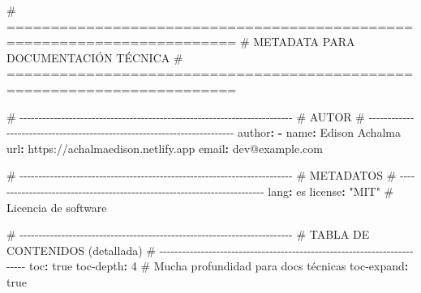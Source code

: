 \documentclass[
  doc,
  floatsintext,
  longtable,
  a4paper,
  nolmodern,
  notxfonts,
  notimes,
  12pt,
  colorlinks=true,linkcolor=blue,citecolor=blue,urlcolor=blue]{apa7}
\newenvironment{Shaded}{\begin{snugshade}}{\end{snugshade}}
\newcommand{\AttributeTok}[1]{\textcolor[rgb]{0.40,0.45,0.13}{#1}}
\newcommand{\CharTok}[1]{\textcolor[rgb]{0.13,0.47,0.30}{#1}}
\newcommand{\CommentTok}[1]{\textcolor[rgb]{0.37,0.37,0.37}{#1}}
\newcommand{\DecValTok}[1]{\textcolor[rgb]{0.68,0.00,0.00}{#1}}
\newcommand{\FunctionTok}[1]{\textcolor[rgb]{0.28,0.35,0.67}{#1}}
\newcommand{\KeywordTok}[1]{\textcolor[rgb]{0.00,0.23,0.31}{\textbf{#1}}}
\newcommand{\StringTok}[1]{\textcolor[rgb]{0.13,0.47,0.30}{#1}}
\begin{document}
\begin{Shaded}
\begin{Highlighting}[]
\CommentTok{\# ========================================================================}
\CommentTok{\# METADATA PARA DOCUMENTACIÓN TÉCNICA}
\CommentTok{\# ========================================================================}

\CommentTok{\# {-}{-}{-}{-}{-}{-}{-}{-}{-}{-}{-}{-}{-}{-}{-}{-}{-}{-}{-}{-}{-}{-}{-}{-}{-}{-}{-}{-}{-}{-}{-}{-}{-}{-}{-}{-}{-}{-}{-}{-}{-}{-}{-}{-}{-}{-}{-}{-}{-}{-}{-}{-}{-}{-}{-}{-}{-}{-}{-}{-}{-}{-}{-}{-}{-}{-}{-}{-}{-}{-}{-}{-}}
\CommentTok{\# AUTOR}
\CommentTok{\# {-}{-}{-}{-}{-}{-}{-}{-}{-}{-}{-}{-}{-}{-}{-}{-}{-}{-}{-}{-}{-}{-}{-}{-}{-}{-}{-}{-}{-}{-}{-}{-}{-}{-}{-}{-}{-}{-}{-}{-}{-}{-}{-}{-}{-}{-}{-}{-}{-}{-}{-}{-}{-}{-}{-}{-}{-}{-}{-}{-}{-}{-}{-}{-}{-}{-}{-}{-}{-}{-}{-}{-}}
\FunctionTok{author}\KeywordTok{:}
\AttributeTok{  }\KeywordTok{{-}}\AttributeTok{ }\FunctionTok{name}\KeywordTok{:}\AttributeTok{ Edison Achalma}
\AttributeTok{    }\FunctionTok{url}\KeywordTok{:}\AttributeTok{ https://achalmaedison.netlify.app}
\AttributeTok{    }\FunctionTok{email}\KeywordTok{:}\AttributeTok{ dev@example.com}

\CommentTok{\# {-}{-}{-}{-}{-}{-}{-}{-}{-}{-}{-}{-}{-}{-}{-}{-}{-}{-}{-}{-}{-}{-}{-}{-}{-}{-}{-}{-}{-}{-}{-}{-}{-}{-}{-}{-}{-}{-}{-}{-}{-}{-}{-}{-}{-}{-}{-}{-}{-}{-}{-}{-}{-}{-}{-}{-}{-}{-}{-}{-}{-}{-}{-}{-}{-}{-}{-}{-}{-}{-}{-}{-}}
\CommentTok{\# METADATOS}
\CommentTok{\# {-}{-}{-}{-}{-}{-}{-}{-}{-}{-}{-}{-}{-}{-}{-}{-}{-}{-}{-}{-}{-}{-}{-}{-}{-}{-}{-}{-}{-}{-}{-}{-}{-}{-}{-}{-}{-}{-}{-}{-}{-}{-}{-}{-}{-}{-}{-}{-}{-}{-}{-}{-}{-}{-}{-}{-}{-}{-}{-}{-}{-}{-}{-}{-}{-}{-}{-}{-}{-}{-}{-}{-}}
\FunctionTok{lang}\KeywordTok{:}\AttributeTok{ es}
\FunctionTok{license}\KeywordTok{:}\AttributeTok{ }\StringTok{"MIT"}\CommentTok{              \# Licencia de software}

\CommentTok{\# {-}{-}{-}{-}{-}{-}{-}{-}{-}{-}{-}{-}{-}{-}{-}{-}{-}{-}{-}{-}{-}{-}{-}{-}{-}{-}{-}{-}{-}{-}{-}{-}{-}{-}{-}{-}{-}{-}{-}{-}{-}{-}{-}{-}{-}{-}{-}{-}{-}{-}{-}{-}{-}{-}{-}{-}{-}{-}{-}{-}{-}{-}{-}{-}{-}{-}{-}{-}{-}{-}{-}{-}}
\CommentTok{\# TABLA DE CONTENIDOS (detallada)}
\CommentTok{\# {-}{-}{-}{-}{-}{-}{-}{-}{-}{-}{-}{-}{-}{-}{-}{-}{-}{-}{-}{-}{-}{-}{-}{-}{-}{-}{-}{-}{-}{-}{-}{-}{-}{-}{-}{-}{-}{-}{-}{-}{-}{-}{-}{-}{-}{-}{-}{-}{-}{-}{-}{-}{-}{-}{-}{-}{-}{-}{-}{-}{-}{-}{-}{-}{-}{-}{-}{-}{-}{-}{-}{-}}
\FunctionTok{toc}\KeywordTok{:}\AttributeTok{ }\CharTok{true}
\FunctionTok{toc{-}depth}\KeywordTok{:}\AttributeTok{ }\DecValTok{4}\CommentTok{                \# Mucha profundidad para docs técnicas}
\FunctionTok{toc{-}expand}\KeywordTok{:}\AttributeTok{ }\CharTok{true}


\end{Highlighting}
\end{Shaded}
\end{document}
